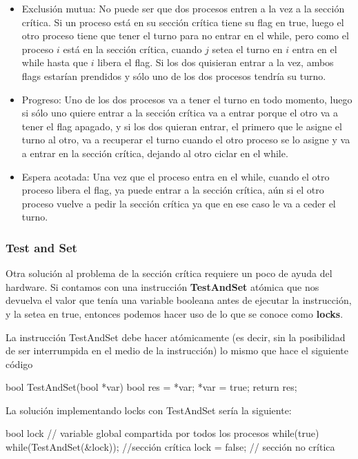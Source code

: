 \documentclass{article}
\begin{document}
\begin{itemize}
\item Exclusi\'on mutua: No puede ser que dos procesos entren a la vez a la secci\'on cr\'itica. Si un proceso est\'a en su secci\'on cr\'itica tiene su flag en true, luego el otro proceso tiene que tener el turno para no entrar en el while, pero como el proceso $i$ est\'a en la secci\'on cr\'itica, cuando $j$ setea el turno en $i$ entra en el while hasta que $i$ libera el flag. Si los dos quisieran entrar a la vez, ambos flags estar\'ian prendidos y s\'olo uno de los dos procesos tendr\'ia su turno.
\item Progreso: Uno de los dos procesos va a tener el turno en todo momento, luego si s\'olo uno quiere entrar a la secci\'on cr\'itica va a entrar porque el otro va a tener el flag apagado, y si los dos quieran entrar, el primero que le asigne el turno al otro, va a recuperar el turno cuando el otro proceso se lo asigne y va a entrar en la secci\'on cr\'itica, dejando al otro ciclar en el while.
\item Espera acotada: Una vez que el proceso entra en el while, cuando el otro proceso libera el flag, ya puede entrar a la secci\'on cr\'itica, a\'un si el otro proceso vuelve a pedir la secci\'on cr\'itica ya que en ese caso le va a ceder el turno.
\end{itemize}

\subsubsection{Test and Set}

Otra soluci\'on al problema de la secci\'on cr\'itica requiere un poco de ayuda del hardware. Si contamos con una instrucci\'on \textbf{TestAndSet} at\'omica que nos devuelva el valor que ten\'ia una variable booleana antes de ejecutar la instrucci\'on, y la setea en true, entonces podemos hacer uso de lo que se conoce como \textbf{locks}.

La instrucci\'on TestAndSet debe hacer at\'omicamente (es decir, sin la posibilidad de ser interrumpida en el medio de la instrucci\'on) lo mismo que hace el siguiente c\'odigo

\begin{code}
bool TestAndSet(bool *var)
{
    bool res = *var;
		*var = true;
		return res;
}
\end{code}

La soluci\'on implementando locks con TestAndSet ser\'ia la siguiente:

\begin{code}
bool lock // variable global compartida por todos los procesos
while(true)
{
    while(TestAndSet(&lock));
		//sección crítica
		lock = false;
		// sección no crítica
}
\end{code}
\end{document}
